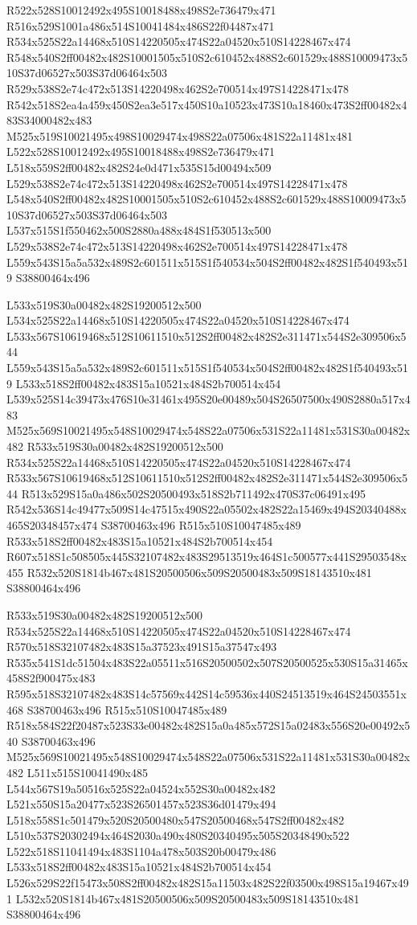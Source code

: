 \documentclass{article}
\begin{document}
\begin{multicols}{2}
R522x528S10012492x495S10018488x498S2e736479x471 R516x529S1001a486x514S10041484x486S22f04487x471 R534x525S22a14468x510S14220505x474S22a04520x510S14228467x474 R548x540S2ff00482x482S10001505x510S2c610452x488S2c601529x488S10009473x510S37d06527x503S37d06464x503 R529x538S2e74c472x513S14220498x462S2e700514x497S14228471x478 R542x518S2ea4a459x450S2ea3e517x450S10a10523x473S10a18460x473S2ff00482x483S34000482x483 M525x519S10021495x498S10029474x498S22a07506x481S22a11481x481 L522x528S10012492x495S10018488x498S2e736479x471 L518x559S2ff00482x482S24e0d471x535S15d00494x509 L529x538S2e74c472x513S14220498x462S2e700514x497S14228471x478 L548x540S2ff00482x482S10001505x510S2c610452x488S2c601529x488S10009473x510S37d06527x503S37d06464x503 L537x515S1f550462x500S2880a488x484S1f530513x500 L529x538S2e74c472x513S14220498x462S2e700514x497S14228471x478 L559x543S15a5a532x489S2c601511x515S1f540534x504S2ff00482x482S1f540493x519 S38800464x496

L533x519S30a00482x482S19200512x500 L534x525S22a14468x510S14220505x474S22a04520x510S14228467x474 L533x567S10619468x512S10611510x512S2ff00482x482S2e311471x544S2e309506x544 L559x543S15a5a532x489S2c601511x515S1f540534x504S2ff00482x482S1f540493x519 L533x518S2ff00482x483S15a10521x484S2b700514x454 L539x525S14c39473x476S10e31461x495S20e00489x504S26507500x490S2880a517x483 M525x569S10021495x548S10029474x548S22a07506x531S22a11481x531S30a00482x482 R533x519S30a00482x482S19200512x500 R534x525S22a14468x510S14220505x474S22a04520x510S14228467x474 R533x567S10619468x512S10611510x512S2ff00482x482S2e311471x544S2e309506x544 R513x529S15a0a486x502S20500493x518S2b711492x470S37c06491x495 R542x536S14c49477x509S14c47515x490S22a05502x482S22a15469x494S20340488x465S20348457x474 S38700463x496 R515x510S10047485x489 R533x518S2ff00482x483S15a10521x484S2b700514x454 R607x518S1c508505x445S32107482x483S29513519x464S1c500577x441S29503548x455 R532x520S1814b467x481S20500506x509S20500483x509S18143510x481 S38800464x496

R533x519S30a00482x482S19200512x500 R534x525S22a14468x510S14220505x474S22a04520x510S14228467x474 R570x518S32107482x483S15a37523x491S15a37547x493 R535x541S1dc51504x483S22a05511x516S20500502x507S20500525x530S15a31465x458S2f900475x483 R595x518S32107482x483S14c57569x442S14c59536x440S24513519x464S24503551x468 S38700463x496 R515x510S10047485x489 R518x584S22f20487x523S33e00482x482S15a0a485x572S15a02483x556S20e00492x540 S38700463x496 M525x569S10021495x548S10029474x548S22a07506x531S22a11481x531S30a00482x482 L511x515S10041490x485 L544x567S19a50516x525S22a04524x552S30a00482x482 L521x550S15a20477x523S26501457x523S36d01479x494 L518x558S1c501479x520S20500480x547S20500468x547S2ff00482x482 L510x537S20302494x464S2030a490x480S20340495x505S20348490x522 L522x518S11041494x483S1104a478x503S20b00479x486 L533x518S2ff00482x483S15a10521x484S2b700514x454 L526x529S22f15473x508S2ff00482x482S15a11503x482S22f03500x498S15a19467x491 L532x520S1814b467x481S20500506x509S20500483x509S18143510x481 S38800464x496


\end{multicols}
\end{document}
